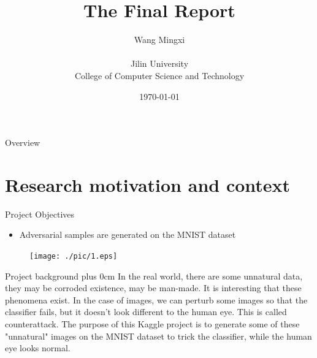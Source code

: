 \documentclass[
 size=14pt,
 paper=smartboard,  %
 mode=present, 		%
 display=slides, 	%
 style=tuliplab,  	%
 pauseslide,
 fleqn,leqno]{powerdot}
\title{The Final Report}
\author{
Wang Mingxi
\\
\\Jilin University
\\College of Computer Science and Technology
}
\date{\today} %
\renewcommand{\raggedright}{\leftskip=0pt \rightskip=0pt plus 0cm}
\begin{document}
\maketitle



\begin{slide}[toc=,bm=]{Overview}
\tableofcontents[content=currentsection,type=1]
\end{slide}


\section{Research motivation and context}

\begin{slide}{Project Objectives}

\begin{itemize}
\item Adversarial samples are generated on the MNIST dataset
\end{itemize}

\begin{center}
	\begin{figure}[htbp]
		\texttt{[image: ./pic/1.eps]}
	\end{figure}
\end{center}

\end{slide}

\begin{slide}{Project background}
\raggedright
In the real world, there are some unnatural data, they may be corroded existence, may be man-made.
It is interesting that these phenomena exist.
In the case of images, we can perturb some images so that the classifier fails, but it doesn't look different to the human eye.
This is called counterattack.
The purpose of this Kaggle project is to generate some of these "unnatural" images on the MNIST dataset to trick the classifier, while the human eye looks normal.
\end{slide}
\end{document}

